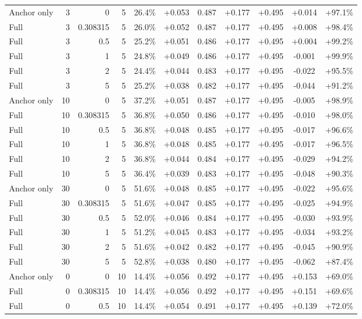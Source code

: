\begin{table}[htbp]
\begin{tabular}{lrrrccccccc}
Anchor only & 3 & 0 & 5 & 26.4\% & +0.053 & 0.487 & +0.177 & +0.495 & +0.014 & +97.1\% \\
Full & 3 & 0.308315 & 5 & 26.0\% & +0.052 & 0.487 & +0.177 & +0.495 & +0.008 & +98.4\% \\
Full & 3 & 0.5 & 5 & 25.2\% & +0.051 & 0.486 & +0.177 & +0.495 & +0.004 & +99.2\% \\
Full & 3 & 1 & 5 & 24.8\% & +0.049 & 0.486 & +0.177 & +0.495 & -0.001 & +99.9\% \\
Full & 3 & 2 & 5 & 24.4\% & +0.044 & 0.483 & +0.177 & +0.495 & -0.022 & +95.5\% \\
Full & 3 & 5 & 5 & 25.2\% & +0.038 & 0.482 & +0.177 & +0.495 & -0.044 & +91.2\% \\
Anchor only & 10 & 0 & 5 & 37.2\% & +0.051 & 0.487 & +0.177 & +0.495 & -0.005 & +98.9\% \\
Full & 10 & 0.308315 & 5 & 36.8\% & +0.050 & 0.486 & +0.177 & +0.495 & -0.010 & +98.0\% \\
Full & 10 & 0.5 & 5 & 36.8\% & +0.048 & 0.485 & +0.177 & +0.495 & -0.017 & +96.6\% \\
Full & 10 & 1 & 5 & 36.8\% & +0.048 & 0.485 & +0.177 & +0.495 & -0.017 & +96.5\% \\
Full & 10 & 2 & 5 & 36.8\% & +0.044 & 0.484 & +0.177 & +0.495 & -0.029 & +94.2\% \\
Full & 10 & 5 & 5 & 36.4\% & +0.039 & 0.483 & +0.177 & +0.495 & -0.048 & +90.3\% \\
Anchor only & 30 & 0 & 5 & 51.6\% & +0.048 & 0.485 & +0.177 & +0.495 & -0.022 & +95.6\% \\
Full & 30 & 0.308315 & 5 & 51.6\% & +0.047 & 0.485 & +0.177 & +0.495 & -0.025 & +94.9\% \\
Full & 30 & 0.5 & 5 & 52.0\% & +0.046 & 0.484 & +0.177 & +0.495 & -0.030 & +93.9\% \\
Full & 30 & 1 & 5 & 51.2\% & +0.045 & 0.483 & +0.177 & +0.495 & -0.034 & +93.2\% \\
Full & 30 & 2 & 5 & 51.6\% & +0.042 & 0.482 & +0.177 & +0.495 & -0.045 & +90.9\% \\
Full & 30 & 5 & 5 & 52.8\% & +0.038 & 0.480 & +0.177 & +0.495 & -0.062 & +87.4\% \\
Anchor only & 0 & 0 & 10 & 14.4\% & +0.056 & 0.492 & +0.177 & +0.495 & +0.153 & +69.0\% \\
Full & 0 & 0.308315 & 10 & 14.4\% & +0.056 & 0.492 & +0.177 & +0.495 & +0.151 & +69.6\% \\
Full & 0 & 0.5 & 10 & 14.4\% & +0.054 & 0.491 & +0.177 & +0.495 & +0.139 & +72.0\% \\

\end{tabular}
\end{table}
